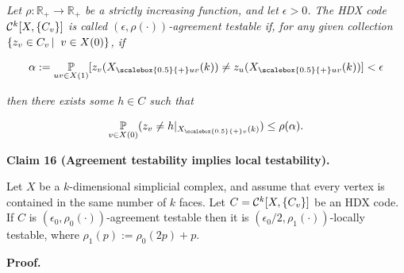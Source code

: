 \documentclass[10pt,a4paper]{article}
\begin{document}
\emph{Let $\rho:\mathbb{R}_{+}\to\mathbb{R}_{+}$ be a strictly increasing function, and let $\epsilon>0$.
The HDX code ${\cal C}^{k}[X,\{C_{v}\}]$ is called $(\epsilon,\rho(\cdot))$-agreement testable if, for any given collection $\left\{z_{v}\in C_{v}\left|\;\vphantom{z_{v}\in C_{v}v\in X(0)}\right.v\in X(0)\right\}$, if}\par


\[\begin{gathered}
\alpha:=\operatorname*{\mathbb{P}}_{uv\in X(1)}[z_{v}({X}_{\scalebox{0.5}{+}uv}(k))\neq z_{u}({X}_{\scalebox{0.5}{+}uv}(k))]<\epsilon
\end{gathered}\]


\emph{then there exists some $h\in C$ such that}\par


\[\begin{gathered}
\operatorname*{\mathbb{P}}_{v\in X(0)}(z_{v}\neq h|_{{X}_{\scalebox{0.5}{+}v}(k)})\leq\rho(\alpha).
\end{gathered}\]







\par\medskip\noindent\textbf{
Claim 16 (Agreement testability implies local testability). 
}\par



Let $X$ be a $k$-dimensional simplicial complex, and assume that every vertex is contained in the same number of $k$ faces. Let $C={\cal C}^{k}[X,\{C_{v}\}]$ be an HDX code.
If $C$ is $(\epsilon_{0},\rho_{0}(\cdot))$-agreement testable then it is $(\epsilon_{0}/2,\rho_{1}(\cdot))$-locally testable, where $\rho_{1}(p):=\rho_{0}(2p)+p$.\par







\par\medskip\noindent\textbf{
\textbf{Proof}.}\par
\end{document}
